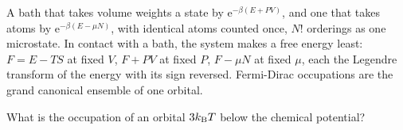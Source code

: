 \begin{keyidea}
A bath that takes volume weights a state by $\mathrm{e}^{-\beta(E +
PV)}$, and one that takes atoms by $\mathrm{e}^{-\beta(E - \mu N)}$, with
identical atoms counted once, $N!$ orderings as one microstate. In
contact with a bath, the system makes a free energy least: $F = E - TS$ at
fixed $V$, $F + PV$ at fixed $P$, $F - \mu N$ at fixed $\mu$, each the
Legendre transform of the energy with its sign reversed. Fermi-Dirac
occupations are the grand canonical ensemble of one orbital.
\end{keyidea}


\begin{selfcheck}
What is the occupation of an orbital $3k_{\mathrm{B}} T$ below the chemical
potential?
\end{selfcheck}
